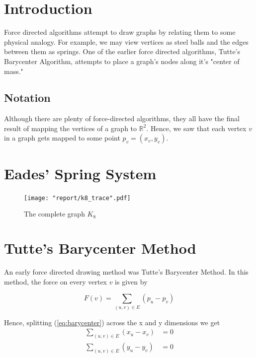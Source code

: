 \documentclass[11pt]{report}
\begin{document}
\section{Introduction}
Force directed algorithms attempt to draw graphs by relating them to some physical analogy. For example, we may view vertices as steel balls and the edges between them as springs. One of the earlier force directed algorithms, Tutte's Barycenter Algorithm, attempts to place a graph's nodes along it's "center of mass."

\subsection{Notation}
Although there are plenty of force-directed algorithms, they all have the final result of mapping the vertices of a graph to $\mathbb{R}^2$. Hence, we saw that each vertex $v$ in a graph gets mapped to some point $p_v = (x_v, y_v)$. 

\section{Eades' Spring System}

\begin{figure}[H]
    \centering
    \texttt{[image: "report/k8\_trace".pdf]}
    \caption{The complete graph $K_8$}
\end{figure}

\section{Tutte's Barycenter Method}
An early force directed drawing method was Tutte's Barycenter Method. In this method, the force on every vertex $v$ is given by 

\begin{equation}\label{eq:barycenter}
F(v) = \sum_{(u, v) \in E} (p_u - p_v)
\end{equation}

Hence, splitting (\ref{eq:barycenter}) across the x and y dimensions we get
\begin{equation}\label{eq:barycenter_split}
    \begin{aligned}
    \sum_{(u, v) \in E} (x_u - x_v) &= 0 \\
    \sum_{(u, v) \in E} (y_u - y_v) &= 0 \\
    \end{aligned}
\end{equation}
\end{document}
